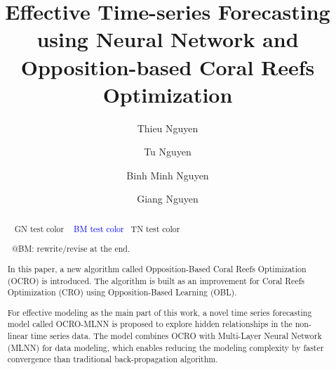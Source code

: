 \documentclass[review,3p,authoryear]{elsarticle}
\def \TN#1{\textcolor{gn_green}{~#1}}			%
\def \BM#1{\textcolor{blue}{~#1}}				%
\def \GN#1{\textcolor{tn_orange}{~#1}}			%
\begin{document}
\begin{frontmatter}

\title{Effective Time-series Forecasting using Neural Network and Opposition-based Coral Reefs Optimization}


%


\author[1]{Thieu Nguyen}
\author[1]{Tu Nguyen}
\author[1]{Binh Minh Nguyen}
\author[2]{Giang Nguyen}

\address[1]{School of Information and Communication Technology, Hanoi University of Science and Technology, Vietnam}
\address[2]{Institute of Informatics, Slovak Academy of Sciences, Dubravska cesta 9, 845 07 Bratislava, Slovakia}


\begin{abstract}
\GN{ GN test color}
\BM{ BM test color}
\TN{TN test color}

\GN{@BM: rewrite/revise at the end. } 

In this paper, a new algorithm called Opposition-Based Coral Reefs Optimization (OCRO) is introduced. The algorithm is built as an improvement for Coral Reefs Optimization (CRO) using Opposition-Based Learning (OBL). 

For effective modeling as the main part of this work, a novel time series forecasting model called OCRO-MLNN is proposed to explore hidden relationships in the non-linear time series data. The model combines OCRO with Multi-Layer Neural Network (MLNN) for data modeling, which enables reducing the modeling complexity by faster convergence than traditional back-propagation algorithm. 


\end{abstract}
\end{frontmatter}
\end{document}
